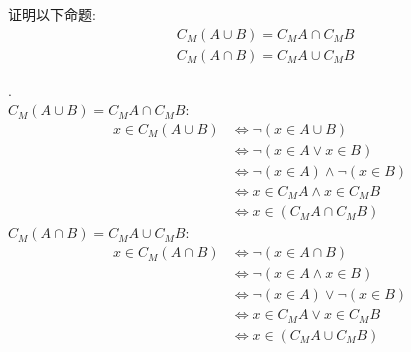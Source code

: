 \begin{exercise}
证明以下命题:
\begin{align*}
    &C_M(A\cup B)=C_M A\cap C_M B\\
    &C_M(A\cap B)=C_M A\cup C_M B
\end{align*}
\end{exercise}
\begin{solution}.\\
$C_M(A\cup B)=C_M A\cap C_M B$:
\begin{align*}
    x\in C_M(A\cup B)&\Leftrightarrow \lnot (x\in A\cup B)\\
    &\Leftrightarrow \lnot (x\in A\lor x\in B)\\
    &\Leftrightarrow \lnot (x\in A)\land \lnot (x\in B)\\
    &\Leftrightarrow x\in C_M A\land x\in C_M B\\
    &\Leftrightarrow x\in (C_M A\cap C_M B)
\end{align*}
$C_M(A\cap B)=C_M A\cup C_M B$:
\begin{align*}
    x\in C_M(A\cap B)&\Leftrightarrow \lnot (x\in A\cap B)\\
    &\Leftrightarrow \lnot (x\in A\land x\in B)\\
    &\Leftrightarrow \lnot (x\in A)\lor \lnot (x\in B)\\
    &\Leftrightarrow x\in C_M A\lor x\in C_M B\\
    &\Leftrightarrow x\in (C_M A\cup C_M B)
\end{align*}
\end{solution}

